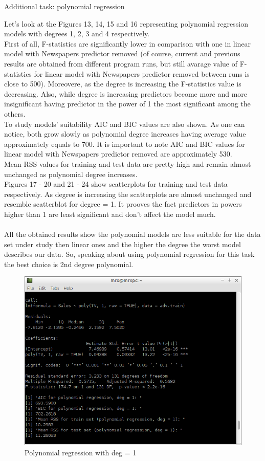 \documentclass[10pt,a4paper]{article}
\begin{document}
\begin{center}
Additional task: polynomial regression
\end{center}
Let's look at the Figures 13, 14, 15 and 16 representing polynomial regression models with degrees 1, 2, 3 and 4 respectively.\\
First of all, F-statistics are significantly lower in comparison with one in linear model with Newspapers predictor removed (of course, current and previous results are obtained from different program runs, but still avarage value of F-statistics for linear model with Newspapers predictor removed between runs is close to 500). Moreovere, as the degree is increasing the F-statistics value is decreasing. Also, while degree is increasing predictors become more and more insignificant having predictor in the power of 1 the most significant among the others.\\
To study models' suitability AIC and BIC values are also shown. As one can notice, both grow slowly as polynomial degree increases having average value approximately equals to 700. It is important to note AIC and BIC values for linear model with Newspapers predictor removed are approximately 530.\\
Mean RSS values for training and test data are pretty high and remain almost unchanged as polynomial degree increases.\\
Figures 17 - 20 and 21 - 24 show scatterplots for training and test data respectively. As degree is increasing the scatterplots are almost unchanged and resemble scatterblot for degree = 1. It prooves the fact predictors in powers higher than 1 are least significant and don't affect the model much.\\
\\
All the obtained results show the polynomial models are less suitable for the data set under study then linear ones and the higher the degree the worst model describes our data. So, speaking about using polynomial regression for this task the best choice is 2nd degree polynomial.


\begin{figure}[H]
\centering
\includegraphics[width=140mm]{figures2/poly1.png}
\caption{Polynomial regression with deg = 1 \label{overflow}}
\end{figure}
\end{document}
